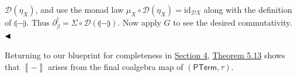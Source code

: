 \hypertarget{html:S5.SS0.SSS0.Px2.SPx1.p5.m3}{}\({{\mathcal{D}}(\eta_{X})}\), and use the monad law %
\hypertarget{html:S5.SS0.SSS0.Px2.SPx1.p5.m4}{}\({\mu_{X}\circ{\mathcal{D}}(\eta_{X})=\mathrm{id}_{{\mathcal{D}}X}}\) along with the definition of %
\hypertarget{html:S5.SS0.SSS0.Px2.SPx1.p5.m5}{}\({\llparenthesis{-}\rrparenthesis}\). Thus %
\hypertarget{html:S5.SS0.SSS0.Px2.SPx1.p5.m6}{}\({\partial_{\beta}^{\dagger}=\Sigma\circ{\mathcal{D}}(\llparenthesis{-}\rrparenthesis)}\). Now apply %
\hypertarget{html:S5.SS0.SSS0.Px2.SPx1.p5.m7}{}\({G}\) to see the desired commutativity. %
\hypertarget{html:S5.SS0.SSS0.Px2.SPx1.p5.m8}{}\({\hfill\blacktriangleleft}\)
\par\medskip
\hypertarget{html:S5.SS0.SSS0.Px2.SPx1.p6}{} Returning to our blueprint for completeness in \hyperlink{html:S4}{Section 4}, \hyperlink{html:S5.Thmtheorem13}{Theorem 5.13} shows that %
\hypertarget{html:S5.SS0.SSS0.Px2.SPx1.p6.m1}{}\({\left\llbracket{-}\right\rrbracket}\) arises from the final coalgebra map of %
\hypertarget{html:S5.SS0.SSS0.Px2.SPx1.p6.m2}{}\({(\mathsf{PTerm},\tau)}\).
\par\medskip
    
